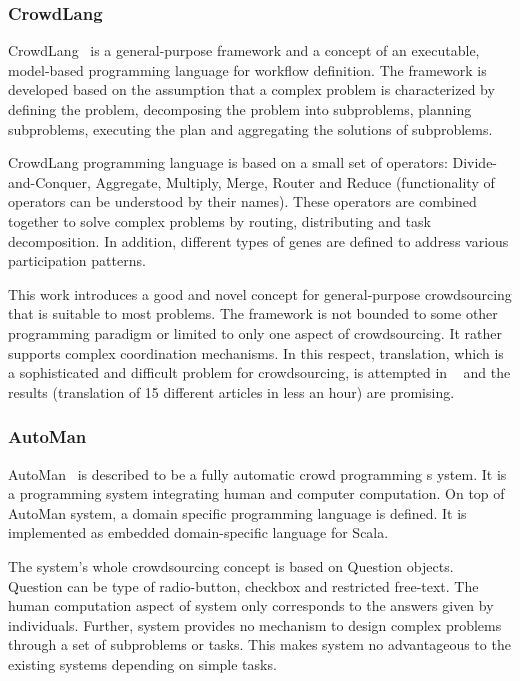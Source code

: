 
\subsubsection{CrowdLang}
CrowdLang~\cite{Minder2011} is a general-purpose framework and a concept of 
an executable, model-based programming language for workflow definition. The 
framework is developed based on the assumption that a complex problem is 
characterized by defining the problem, decomposing the problem into subproblems, 
planning subproblems, executing the plan and aggregating the solutions of subproblems.

CrowdLang programming language is based on a small set of operators: 
Divide-and-Conquer, Aggregate, Multiply, Merge, Router and Reduce 
(functionality of operators can be understood by their names). These operators 
are combined together to solve complex problems by routing, distributing and 
task decomposition. In addition, different types of genes are defined to address 
various participation patterns.

This work introduces a good and novel concept for general-purpose crowdsourcing 
that is suitable to most problems. The framework is not bounded to some other 
programming paradigm or limited to only one aspect of crowdsourcing. It rather 
supports complex coordination mechanisms. In this respect, translation, which is a 
sophisticated and difficult problem for crowdsourcing, is attempted in ~\cite{Minder2012} 
and the results (translation of 15 different articles in less an hour) are promising.


\subsubsection{AutoMan}
AutoMan~\cite{Barowy2012} is described to be a fully automatic crowd programming s
ystem. It is a programming system integrating human and computer computation. 
On top of AutoMan system, a domain specific programming language is defined. 
It is implemented as embedded domain-specific language for Scala.

The system's whole crowdsourcing concept is based on Question objects. 
Question can be type of radio-button, checkbox and restricted free-text. The human 
computation aspect of system only corresponds to the answers given by individuals. 
Further, system provides no mechanism to design complex problems through a 
set of subproblems or tasks. This makes system no advantageous to the 
existing systems depending on simple tasks.

